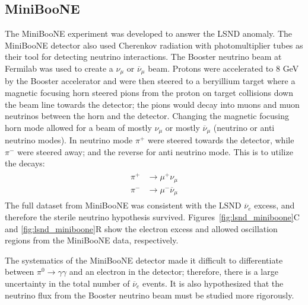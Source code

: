 \documentclass[aps,prd,twocolumn,nofootinbib]{revtex4-1}
\begin{document}
\subsection{MiniBooNE}
The MiniBooNE experiment was developed to answer the LSND anomaly. The MiniBooNE detector also used Cherenkov radiation with photomultiplier tubes as their tool for detecting neutrino interactions. The Booster neutrino beam at Fermilab was used to create a $\nu_\mu$ or $\overline{\nu}_\mu$ beam. Protons were accelerated to 8 GeV by the Booster accelerator and were then steered to a beryillium target where a magnetic focusing horn steered pions from the proton on target collisions down the beam line towards the detector; the pions would decay into muons and muon neutrinos between the horn and the detector. Changing the magnetic focusing horn mode allowed for a beam of mostly $\nu_\mu$ or mostly $\overline{\nu}_\mu$ (neutrino or anti neutrino modes). In neutrino mode $\pi^+$ were steered towards the detector, while $\pi^-$ were steered away; and the reverse for anti neutrino mode. This is to utilize the decays:
\begin{align}
  \begin{split}
    \pi^+ &\rightarrow \mu^+\nu_\mu \\
    \pi^- &\rightarrow \mu^-\overline{\nu}_\mu  
  \end{split}
\end{align}
The full dataset from MiniBooNE was consistent with the LSND $\overline{\nu}_e$ excess, and therefore the sterile neutrino hypothesis survived. Figures~\ref{fig:lsnd_miniboone}C and \ref{fig:lsnd_miniboone}R show the electron excess and allowed oscillation regions from the MiniBooNE data, respectively.

The systematics of the MiniBooNE detector made it difficult to differentiate between $\pi^0 \rightarrow \gamma\gamma$ and an electron in the detector; therefore, there is a large uncertainty in the total number of $\overline{\nu}_e$ events. It is also hypothesized that the neutrino flux from the Booster neutrino beam must be studied more rigorously.
\end{document}
